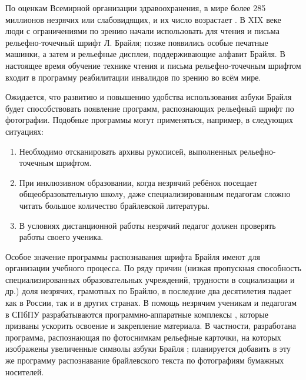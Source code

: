 \documentclass{main.tex}[subfiles]
\begin{document}
По оценкам Всемирной организации здравоохранения, в мире более 285 миллионов незрячих или слабовидящих, и их число возрастает \cite{who_report2012}.
В XIX веке люди с ограничениями по зрению начали использовать для чтения и письма рельефно-точечный шрифт Л. Брайля; позже появились особые печатные машинки, а затем и рельефные дисплеи, поддерживающие алфавит Брайля.
В настоящее время обучение технике чтения и письма рельефно-точечным шрифтом входит в программу реабилитации инвалидов по зрению во всём мире.

Ожидается, что развитию и повышению удобства использования азбуки Брайля будет способствовать появление программ, распознающих рельефный шрифт по фотографии.
Подобные программы могут применяться, например, в следующих ситуациях:
\begin{enumerate}[noitemsep]
    \item Необходимо отсканировать архивы рукописей, выполненных рельефно-точечным шрифтом.
	\item При инклюзивном образовании, когда незрячий ребёнок посещает общеобразовательную школу, даже специализированным педагогам сложно читать большое количество брайлевской литературы.
    \item В условиях дистанционной работы незрячий педагог должен проверять работы своего ученика.
\end{enumerate}

Особое значение программы распознавания шрифта Брайля имеют для организации учебного процесса.
По ряду причин (низкая пропускная способность специализированных образовательных учреждений, трудности в социализации и др.) доля незрячих, грамотных по Брайлю, в последние два десятилетия падает как в России, так и в других странах.
В помощь незрячим ученикам и педагогам в СПбПУ разрабатываются программно-аппаратные комплексы \cite{begun2019} \cite{zuev2021}, которые призваны ускорить освоение и закрепление материала.
В частности, разработана программа, распознающая по фотоснимкам рельефные карточки, на которых изображены увеличенные символы азбуки Брайля \cite{zuev2021}; планируется добавить в эту же программу распознавание брайлевского текста по фотографиям бумажных носителей.
\end{document}
